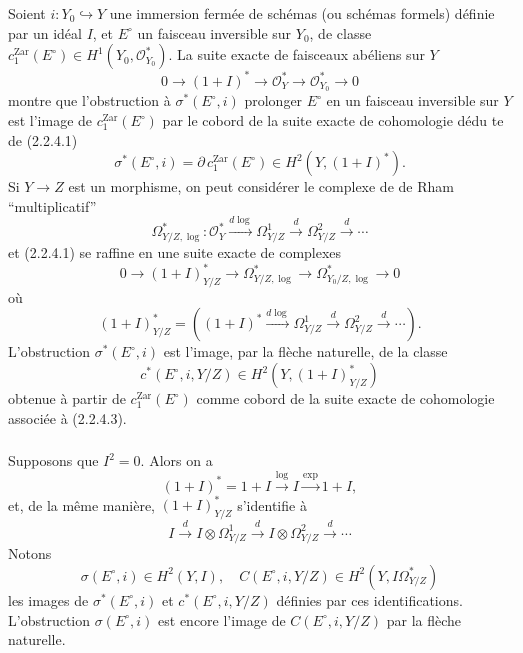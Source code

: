 \documentclass[12pt,a4paper]{article}
\theoremstyle{plain}
\theoremstyle{definition}
\theoremstyle{remark}
\begin{document}
\subsubsection{}
Soient $i : Y_0 \hookrightarrow Y$ une immersion ferm\'ee de sch\'emas (ou sch\'emas formels) d\'efinie par un id\'eal $I$, et $E^\circ$ un faisceau inversible sur $Y_0$, de classe $c_1^\mathrm{Zar}(E^\circ) \in H^1(Y_0, \mathcal{O}_{Y_0}^*)$. La suite exacte de faisceaux ab\'eliens sur $Y$
\begin{equation}\tag{2.2.4.1}
0 \longrightarrow (1+I)^* \longrightarrow \mathcal{O}_Y^* \longrightarrow \mathcal{O}_{Y_0}^* \longrightarrow 0 
\end{equation}
montre que l'obstruction \`a $\sigma^*(E^\circ, i)$ prolonger $E^\circ$ en un faisceau inversible sur $Y$ est l'image de $c_1^\mathrm{Zar}(E^\circ)$ par le cobord de la suite exacte de cohomologie d\'edu te de (2.2.4.1)
\begin{equation}\tag{2.2.4.2}
\sigma^*(E^\circ, i) = \partial \, c_1^\mathrm{Zar}(E^\circ) \in H^2(Y, (1+I)^*). 
\end{equation}
Si $Y \to Z$ est un morphisme, on peut consid\'erer le complexe de de Rham ``multiplicatif''
\[
\Omega^*_{Y/Z, \log} : \mathcal{O}_Y^* \xrightarrow{d\log} \Omega^1_{Y/Z} \xrightarrow{d} \Omega^2_{Y/Z} \xrightarrow{d} \cdots
\]
et (2.2.4.1) se raffine en une suite exacte de complexes
\begin{equation}\tag{2.2.4.3}
0 \longrightarrow (1+I)^*_{Y/Z} \longrightarrow \Omega^*_{Y/Z, \log} \longrightarrow \Omega^*_{Y_0/Z, \log} \longrightarrow 0 
\end{equation}
o\`u
\[
(1+I)^*_{Y/Z} = ((1+I)^* \xrightarrow{d\log} \Omega^1_{Y/Z} \xrightarrow{d} \Omega^2_{Y/Z} \xrightarrow{d} \cdots).
\]
L'obstruction $\sigma^*(E^\circ, i)$ est l'image, par la fl\`eche naturelle, de la classe
\begin{equation}\tag{2.2.4.4}
c^*(E^\circ, i, Y/Z) \in H^2(Y, (1+I)^*_{Y/Z}) 
\end{equation}
obtenue \`a partir de $c_1^\mathrm{Zar}(E^\circ)$ comme cobord de la suite exacte de cohomologie associ\'ee \`a (2.2.4.3).

\subsubsection{}
Supposons que $I^2 = 0$. Alors on a
\[
(1+I)^* = 1+I \xrightarrow{\log} I \xrightarrow{\exp} 1+I,
\]
et, de la m\^eme mani\`ere, $(1+I)^*_{Y/Z}$ s'identifie \`a
\[
I \xrightarrow{d} I \otimes \Omega^1_{Y/Z} \xrightarrow{d} I \otimes \Omega^2_{Y/Z} \xrightarrow{d} \cdots
\]
Notons
\begin{equation}\tag{2.2.5.1}
\sigma(E^\circ, i) \in H^2(Y, I), \quad C(E^\circ, i, Y/Z) \in H^2(Y, I\Omega^*_{Y/Z}) 
\end{equation}
les images de $\sigma^*(E^\circ, i)$ et $c^*(E^\circ, i, Y/Z)$ d\'efinies par ces identifications. L'obstruction $\sigma(E^\circ, i)$ est encore l'image de $C(E^\circ, i, Y/Z)$ par la fl\`eche naturelle.
\end{document}
